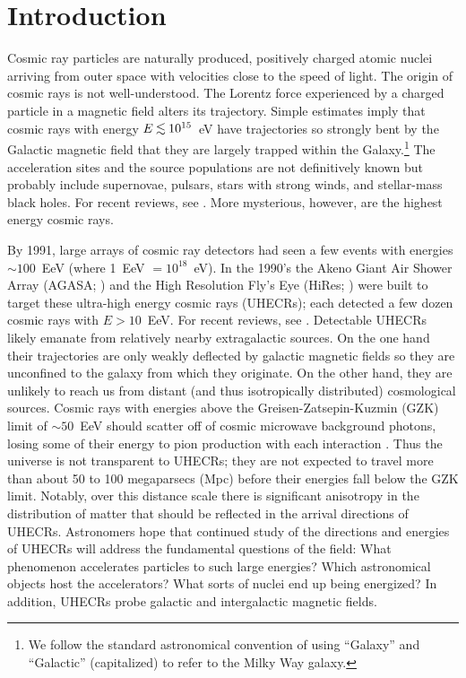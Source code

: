 \section{Introduction}

Cosmic ray particles are naturally produced, positively charged atomic nuclei
arriving from outer space with velocities close to the speed of light.  
The origin of cosmic rays is not well-understood. The Lorentz force
experienced by a charged particle in a magnetic field alters its trajectory.
Simple estimates imply that cosmic rays with energy $E \lta 10^{15}$~eV 
have trajectories so strongly bent
by the Galactic magnetic field that they are largely trapped within the
Galaxy.\footnote{We follow the standard astronomical convention of using
``Galaxy'' and ``Galactic'' (capitalized) to refer to the Milky Way galaxy.}
The acceleration sites and the source populations are not definitively known
but probably include supernovae, pulsars, stars with strong winds, and
stellar-mass black holes.  For recent reviews, see \cite{Cronin99,Hillas06}.
More mysterious, however, are the highest energy cosmic rays.

By 1991, large arrays of cosmic ray detectors had seen a few events with
energies $\sim 100$~EeV (where 1~EeV $=10^{18}$~eV). In the 1990's the Akeno
Giant Air Shower Array (AGASA; \cite{1992APh.....1...27C}) and the High
Resolution Fly's Eye (HiRes; \cite{2002NIMPA.482..457B}) were built to
target these ultra-high energy cosmic rays (UHECRs); each detected a few
dozen cosmic rays with $E>10$~EeV.  For recent reviews, see
\cite{KO11-UHECRs,LS11-UHECRs}.
Detectable UHECRs likely emanate from relatively nearby extragalactic
sources. On the one hand their trajectories are only weakly deflected by
galactic magnetic fields so they are unconfined to the galaxy from which
they originate.  On the other hand, they are unlikely to reach us from
distant (and thus isotropically distributed) cosmological sources.  Cosmic
rays with energies above the Greisen-Zatsepin-Kuzmin (GZK) limit of $\sim
50$~EeV  should scatter off of cosmic microwave background photons, losing
some of their energy to pion production with each interaction
\cite{G66-GZK,ZK66-GZK}.  Thus the universe is not transparent to UHECRs;
they are not expected to travel more than about 50 to 100 megaparsecs (Mpc)
before their energies fall below the GZK limit. Notably, over this distance
scale there is significant anisotropy in the distribution of matter that
should be reflected in the arrival directions of UHECRs. Astronomers hope
that continued study of the directions and energies of UHECRs will address
the fundamental questions of the field: What phenomenon accelerates
particles to such large energies?  Which astronomical objects host the
accelerators?  What sorts of nuclei end up being energized?  In addition,
UHECRs probe galactic and intergalactic magnetic fields.

